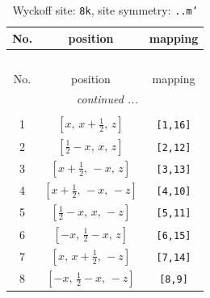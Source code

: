 \documentclass[fleqn,8pt]{jsarticle}
\begin{document}
\begin{longtable}{ccc}
\caption{Wyckoff site: {\tt 8k}, site symmetry: {\tt ..m'}}
 \\
 \hline \hline
No. & position & mapping \\ \hline \endfirsthead

\multicolumn{2}{l}{\tablename\ \thetable{}} \\
 \hline \hline
No. & position & mapping \\ \hline \endhead

 \hline \hline
\multicolumn{2}{r}{\footnotesize\it continued ...} \\ \endfoot

 \hline \hline
\multicolumn{2}{r}{} \\ \endlastfoot

1 & $\left[ x,\, x + \frac{1}{2},\, z \right]$ & {\tt [1,16]} \\ \hline
2 & $\left[ \frac{1}{2} - x,\, x,\, z \right]$ & {\tt [2,12]} \\ \hline
3 & $\left[ x + \frac{1}{2},\, - x,\, z \right]$ & {\tt [3,13]} \\ \hline
4 & $\left[ x + \frac{1}{2},\, - x,\, - z \right]$ & {\tt [4,10]} \\ \hline
5 & $\left[ \frac{1}{2} - x,\, x,\, - z \right]$ & {\tt [5,11]} \\ \hline
6 & $\left[ - x,\, \frac{1}{2} - x,\, z \right]$ & {\tt [6,15]} \\ \hline
7 & $\left[ x,\, x + \frac{1}{2},\, - z \right]$ & {\tt [7,14]} \\ \hline
8 & $\left[ - x,\, \frac{1}{2} - x,\, - z \right]$ & {\tt [8,9]} \\
\end{longtable}
\renewcommand{\arraystretch}{1.2}
\end{document}
